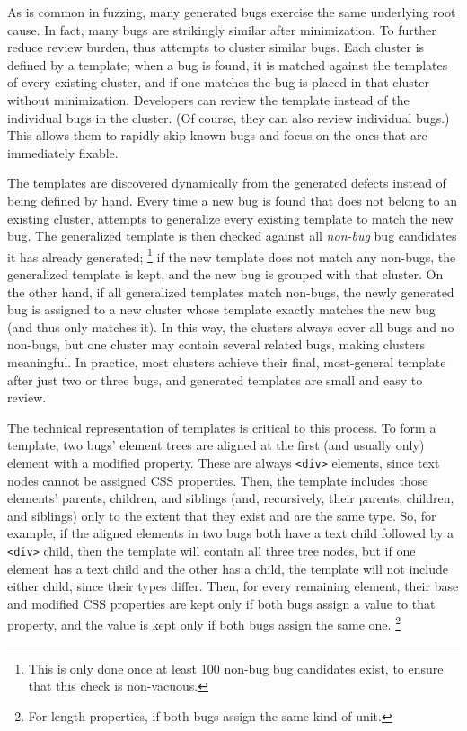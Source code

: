 As is common in fuzzing, many generated bugs
  exercise the same underlying root cause.
In fact, many bugs are strikingly similar after minimization.
To further reduce review burden,
  \toolname thus attempts to cluster similar bugs.
Each cluster is defined by a template;
  when a bug is found,
  it is matched against the templates of every existing cluster,
  and if one matches the bug is placed in that cluster
  without minimization.
Developers can review the template
  instead of the individual bugs in the cluster.
(Of course, they can also review individual bugs.)
This allows them to rapidly skip known bugs
  and focus on the ones that are immediately fixable.

The templates are discovered dynamically from the generated defects
  instead of being defined by hand.
Every time a new bug is found
  that does not belong to an existing cluster,
  \toolname attempts to generalize every existing template
  to match the new bug.
The generalized template is then checked against
  all \emph{non-bug} bug candidates it has already generated;%
\footnote{This is only done once at least 100 non-bug bug candidates exist,
  to ensure that this check is non-vacuous.}
  if the new template does not match any non-bugs,
  the generalized template is kept,
  and the new bug is grouped with that cluster.
On the other hand, if all generalized templates match non-bugs,
  the newly generated bug is assigned to a new cluster
  whose template exactly matches the new bug
  (and thus only matches it).
In this way, the clusters always cover all bugs and no non-bugs,
  but one cluster may contain several related bugs,
  making clusters meaningful.
In practice, most clusters achieve their final, most-general template
  after just two or three bugs,
  and generated templates are small and easy to review.
  
The technical representation of templates is critical to this process.
To form a template, two bugs' element trees
  are aligned at the first (and usually only) element with a modified property.
These are always \texttt{<div>} elements,
  since text nodes cannot be assigned CSS properties.
Then, the template includes those elements'
  parents, children, and siblings
  (and, recursively, their parents, children, and siblings)
  only to the extent that they exist and are the same type.
So, for example, if the aligned elements in two bugs
  both have a text child followed by a \texttt{<div>} child,
  then the template will contain all three tree nodes,
  but if one element has a text child
  and the other has a  child,
  the template will not include either child, since their types differ.
Then, for every remaining element,
  their base and modified CSS properties are kept
  only if both bugs assign a value to that property,
  and the value is kept only if both bugs assign the same one.%
\footnote{For length properties, if both bugs assign the same kind of unit.}

